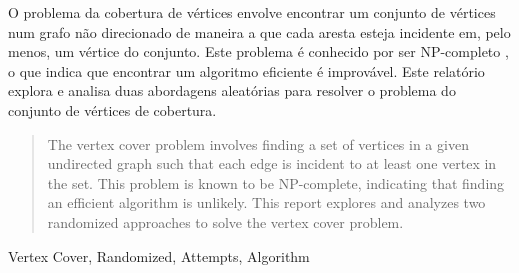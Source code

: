 \begin{resumo}%
  O problema da cobertura de vértices envolve encontrar um conjunto de vértices num grafo não direcionado de maneira a que cada aresta esteja incidente em, pelo menos, um vértice do conjunto. Este problema é conhecido por ser NP-completo \cite{enwiki:1174729149}, o que indica que encontrar um algoritmo eficiente é improvável. Este relatório explora e analisa duas abordagens aleatórias para resolver o problema do conjunto de vértices de cobertura.
\end{resumo}

\begin{abstract}%
The vertex cover problem involves finding a set of vertices in a given undirected graph such that each edge is incident to at least one vertex in the set. This problem is known to be NP-complete\cite{enwiki:1174729149}, indicating that finding an efficient algorithm is unlikely. This report explores and analyzes two randomized approaches to solve the vertex cover problem.
\end{abstract}

\begin{keywords}%
    Vertex Cover, Randomized, Attempts, Algorithm
\end{keywords}
